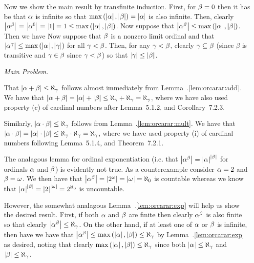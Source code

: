 \begin{solution}
{        Now we show the main result by transfinite induction.
        First, for $\beta = 0$ then it has be that $\alpha$ is infinite so that $\max\left( \left| \alpha \right|, \left| \beta \right| \right) = \left| \alpha \right|$ is also infinite.
        Then, clearly $\left| \alpha^\beta \right| = \left| \alpha^0 \right| = \left| 1 \right| = 1 \leq \max\left( \left| \alpha \right|, \left| \beta \right| \right)$.
        Now suppose that $\left| \alpha^\beta \right| \leq \max\left( \left| \alpha \right|, \left| \beta \right| \right)$.
        Then we have
        Now suppose that $\beta$ is a nonzero limit ordinal and that $\left| \alpha^\gamma \right| \leq \max\left( \left| \alpha \right|, \left| \gamma \right| \right)$ for all $\gamma < \beta$.
        Then, for any $\gamma < \beta$, clearly $\gamma \subseteq \beta$ (since $\beta$ is transitive and $\gamma \in \beta$ since $\gamma < \beta$) so that $\left| \gamma \right| \leq \left| \beta \right|$.
        
    }
    
    \emph{Main Problem.}

    That $\left| \alpha + \beta \right| \leq \aleph_\gamma$ follows almost immediately from Lemma~\ex.\ref{lem:orcarar:add}.
    We have that $\left| \alpha + \beta \right| = \left| \alpha \right| + \left| \beta \right| \leq \aleph_\gamma + \aleph_\gamma = \aleph_\gamma$, where we have also used property (c) of cardinal numbers after Lemma~5.1.2, and Corollary~7.2.3.

    Similarly, $\left| \alpha \cdot \beta \right| \leq \aleph_\gamma$ follows from Lemma~\ex.\ref{lem:orcarar:mult}.
    We have that $\left| \alpha \cdot \beta \right| = \left| \alpha \right| \cdot \left| \beta \right| \leq \aleph_\gamma \cdot \aleph_\gamma = \aleph_\gamma$, where we have used property (i) of cardinal numbers following Lemma~5.1.4, and Theorem~7.2.1.

    The analagous lemma for ordinal exponentiation (i.e. that $\left| \alpha^\beta \right| = \left| \alpha \right|^{\left| \beta \right|}$ for ordinals $\alpha$ and $\beta$) is evidently not true.
    As a counterexample consider $\alpha = 2$ and $\beta = \omega$.
    We then have that $\left| \alpha^\beta \right| = \left| 2^\omega \right| = \left| \omega \right| = \aleph_0$ is countable whereas we know that $\left| \alpha \right|^{\left| \beta \right|} = \left| 2 \right|^{\left| \omega \right|} = 2^{\aleph_0}$ is uncountable.

    However, the somewhat analagous Lemma~\ex.\ref{lem:orcarar:exp} will help us show the desired result.
    First, if both $\alpha$ and $\beta$ are finite then clearly $\alpha^\beta$ is also finite so that clearly $\left| \alpha^\beta \right| \leq \aleph_\gamma$.
    On the other hand, if at least one of $\alpha$ or $\beta$ is infinite, then have we have that $\left| \alpha^\beta \right| \leq \max\left( \left| \alpha \right|, \left| \beta \right| \right) \leq \aleph_\gamma$ by Lemma~\ex.\ref{lem:orcarar:exp} as desired, noting that clearly $\max\left( \left| \alpha \right|, \left| \beta \right| \right) \leq \aleph_\gamma$ since both $\left| \alpha \right| \leq \aleph_\gamma$ and $\left| \beta \right| \leq \aleph_\gamma$. \qedsymbol
\end{solution}

